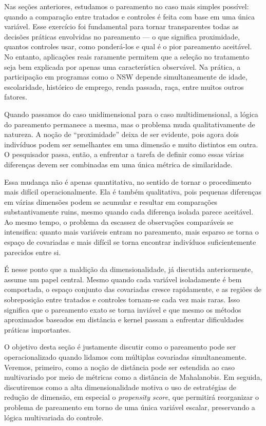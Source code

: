 Nas seções anteriores, estudamos o pareamento no caso mais simples possível: quando a comparação entre tratados e controles é feita com base em uma única variável. Esse exercício foi fundamental para tornar transparentes todas as decisões práticas envolvidas no pareamento — o que significa proximidade, quantos controles usar, como ponderá-los e qual é o pior pareamento aceitável. No entanto, aplicações reais raramente permitem que a seleção no tratamento seja bem explicada por apenas uma característica observável. Na prática, a participação em programas como o NSW depende simultaneamente de idade, escolaridade, histórico de emprego, renda passada, raça, entre muitos outros fatores.

Quando passamos do caso unidimensional para o caso multidimensional, a lógica do pareamento permanece a mesma, mas o problema muda qualitativamente de natureza. A noção de ``proximidade'' deixa de ser evidente, pois agora dois indivíduos podem ser semelhantes em uma dimensão e muito distintos em outra. O pesquisador passa, então, a enfrentar a tarefa de definir como essas várias diferenças devem ser combinadas em uma única métrica de similaridade.

Essa mudança não é apenas quantitativa, no sentido de tornar o procedimento mais difícil operacionalmente. Ela é também qualitativa, pois pequenas diferenças em várias dimensões podem se acumular e resultar em comparações substantivamente ruins, mesmo quando cada diferença isolada parece aceitável. Ao mesmo tempo, o problema da escassez de observações comparáveis se intensifica: quanto mais variáveis entram no pareamento, mais esparso se torna o espaço de covariadas e mais difícil se torna encontrar indivíduos suficientemente parecidos entre si.


É nesse ponto que a maldição da dimensionalidade, já discutida anteriormente, assume um papel central. Mesmo quando cada variável isoladamente é bem comportada, o espaço conjunto das covariadas cresce rapidamente, e as regiões de sobreposição entre tratados e controles tornam-se cada vez mais raras. Isso significa que o pareamento exato se torna inviável e que mesmo os métodos aproximados baseados em distância e kernel passam a enfrentar dificuldades práticas importantes.

O objetivo desta seção é justamente discutir como o pareamento pode ser operacionalizado quando lidamos com múltiplas covariadas simultaneamente. Veremos, primeiro, como a noção de distância pode ser estendida ao caso multivariado por meio de métricas como a distância de Mahalanobis. Em seguida, discutiremos como a alta dimensionalidade motiva o uso de estratégias de redução de dimensão, em especial o \textit{propensity score}, que permitirá reorganizar o problema de pareamento em torno de uma única variável escalar, preservando a lógica multivariada do controle.

